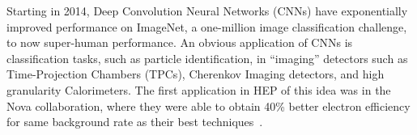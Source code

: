 



Starting in 2014, Deep Convolution Neural Networks (CNNs) have
exponentially improved performance on ImageNet, a one-million image
classification challenge\cite{}, to now super-human
performance\cite{}.  An obvious application of CNNs is classification
tasks, such as particle identification, in ``imaging'' detectors such
as Time-Projection Chambers (TPCs), Cherenkov Imaging detectors, and
high granularity Calorimeters. The first application in HEP of this
idea was in the Nova collaboration, where they were able to obtain
40\% better electron efficiency for same background rate as their best
techniques~\cite{}.

